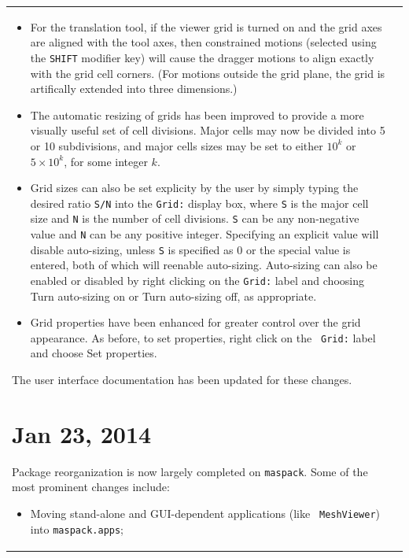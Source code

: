 \documentclass{article}
\begin{document}
\begin{tabular}{ll}
\begin{itemize}
\item For the translation tool, if the viewer grid is turned on and
the grid axes are aligned with the tool axes, then constrained motions
(selected using the {\tt SHIFT} modifier key) will cause the dragger
motions to align exactly with the grid cell corners. (For motions
outside the grid plane, the grid is artifically extended into three
dimensions.)

\item The automatic resizing of grids has been improved to provide a
more visually useful set of cell divisions. Major cells may now be
divided into 5 or 10 subdivisions, and major cells sizes may be
set to either $10^k$ or $5 \times 10^k$, for some integer $k$.

\item Grid sizes can also be set explicity by the user by simply
typing the desired ratio {\tt S/N} into the {\tt Grid:} display box,
where {\tt S} is the major cell size and {\tt N} is the number of cell
divisions. {\tt S} can be any non-negative value and {\tt N} can be
any positive integer. Specifying an explicit value will disable
auto-sizing, unless {\tt S} is specified as 0 or the special value
{\tt *} is entered, both of which will reenable
auto-sizing. Auto-sizing can also be enabled or disabled by right
clicking on the {\tt Grid:} label and choosing {\sf Turn auto-sizing
on} or {\sf Turn auto-sizing off}, as appropriate.

\item Grid properties have been enhanced for greater control over the
grid appearance. As before, to set properties, right click on the {\tt
Grid:} label and choose {\sf Set properties}.

\end{itemize}

The user interface documentation has been updated for these changes.

\section*{Jan 23, 2014}

Package reorganization is now largely completed on {\tt maspack}.
Some of the most prominent changes include:

\begin{itemize}

\item Moving stand-alone and GUI-dependent applications (like {\tt
MeshViewer}) into {\tt maspack.apps};


\end{itemize}
\end{tabular}
\end{document}
